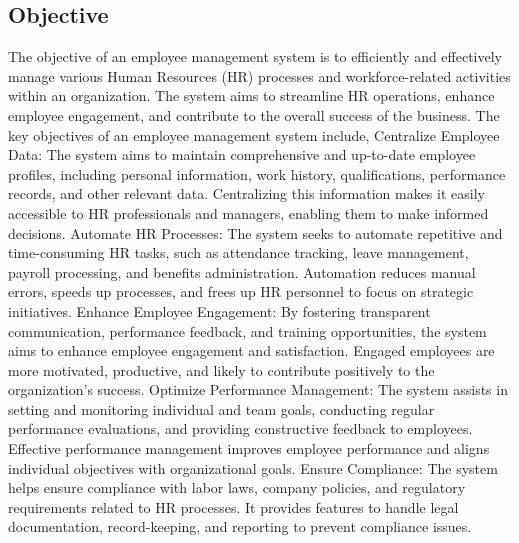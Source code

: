 \subsection{Objective}
The objective of an employee management system is to efficiently and effectively manage various Human Resources (HR) processes and workforce-related activities within an organization. The system aims to streamline HR operations, enhance employee engagement, and contribute to the overall success of the business. The key objectives of an employee management system include, Centralize Employee Data: The system aims to maintain comprehensive and up-to-date employee profiles, including personal information, work history, qualifications, performance records, and other relevant data. Centralizing this information makes it easily accessible to HR professionals and managers, enabling them to make informed decisions. Automate HR Processes: The system seeks to automate repetitive and time-consuming HR tasks, such as attendance tracking, leave management, payroll processing, and benefits administration. Automation reduces manual errors, speeds up processes, and frees up HR personnel to focus on strategic initiatives. Enhance Employee Engagement: By fostering transparent communication, performance feedback, and training opportunities, the system aims to enhance employee engagement and satisfaction. Engaged employees are more motivated, productive, and likely to contribute positively to the organization's success. Optimize Performance Management: The system assists in setting and monitoring individual and team goals, conducting regular performance evaluations, and providing constructive feedback to employees. Effective performance management improves employee performance and aligns individual objectives with organizational goals. Ensure Compliance: The system helps ensure compliance with labor laws, company policies, and regulatory requirements related to HR processes. It provides features to handle legal documentation, record-keeping, and reporting to prevent compliance issues.
